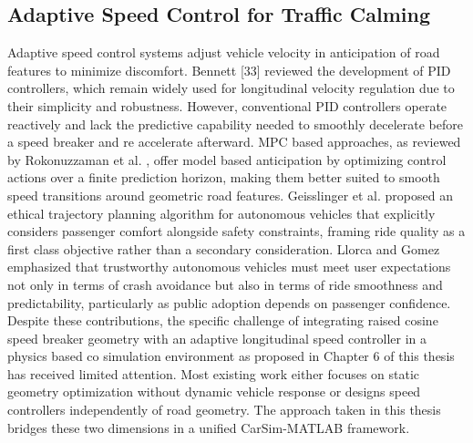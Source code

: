 \documentclass[a4paper,12pt,one side]{report}
\theoremstyle{definition}
\begin{document}
\begin{itemize}
\subsection{Adaptive Speed Control for Traffic Calming}
Adaptive speed control systems adjust vehicle velocity in anticipation of road features to minimize discomfort. Bennett [33] reviewed the development of PID controllers, which remain widely used for longitudinal velocity regulation due to their simplicity and robustness. However, conventional PID controllers operate reactively and lack the predictive capability needed to smoothly decelerate before a speed breaker and re accelerate afterward. MPC based approaches, as reviewed by Rokonuzzaman et al. \cite{rokonuzzaman2021model}, offer model based anticipation by optimizing control actions over a finite prediction horizon, making them better suited to smooth speed transitions around geometric road features.
Geisslinger et al. \cite{geisslinger2023ethical} proposed an ethical trajectory planning algorithm for autonomous vehicles that explicitly considers passenger comfort alongside safety constraints, framing ride quality as a first class objective rather than a secondary consideration. Llorca and Gomez \cite{fernandez2021trustworthy} emphasized that trustworthy autonomous vehicles must meet user expectations not only in terms of crash avoidance but also in terms of ride smoothness and predictability, particularly as public adoption depends on passenger confidence.
Despite these contributions, the specific challenge of integrating raised cosine speed breaker geometry with an adaptive longitudinal speed controller in a physics based co simulation environment as proposed in Chapter 6 of this thesis has received limited attention. Most existing work either focuses on static geometry optimization without dynamic vehicle response or designs speed controllers independently of road geometry. The approach taken in this thesis bridges these two dimensions in a unified CarSim-MATLAB framework.

\end{itemize}
\end{document}
